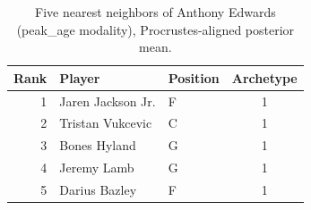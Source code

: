 \begin{table}[htbp]
  \centering\small
  \begin{tabular}{rllc}
    \toprule
    Rank & Player & Position & Archetype \\
    \midrule
    1 & Jaren Jackson Jr. & F & 1 \\
    2 & Tristan Vukcevic & C & 1 \\
    3 & Bones Hyland & G & 1 \\
    4 & Jeremy Lamb & G & 1 \\
    5 & Darius Bazley & F & 1 \\
    \bottomrule
  \end{tabular}
  \caption{Five nearest neighbors of Anthony Edwards (peak_age modality), Procrustes-aligned posterior mean.}
  \label{tab:Anthony_Edwards_neighbors_peak_age}
\end{table}

